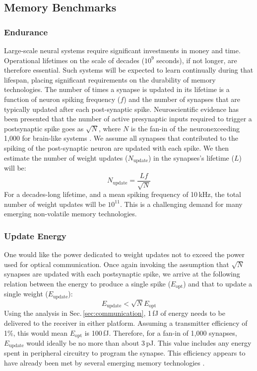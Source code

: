 \documentclass[twocolumn]{article}
\begin{document}
\subsection{Memory Benchmarks}

\subsubsection{Endurance}
Large-scale neural systems require significant investments in money and time. Operational lifetimes on the scale of decades ($10^9$ seconds), if not longer, are therefore essential. Such systems will be expected to learn continually during that lifespan, placing significant requirements on the durability of memory technologies. The number of times a synapse is updated in its lifetime is a function of neuron spiking frequency ($f$) and the number of synapses that are typically updated after each post-synaptic spike. Neuroscientific evidence has been presented that the number of active presynaptic inputs required to trigger a postsynaptic spike goes as $\sqrt{N}$, where $N$ is the fan-in of the neuron\textemdash exceeding 1,000 for brain-like systems \cite{vrso1996,vora2005}. We assume all synapses that contributed to the spiking of the post-synaptic neuron are updated with each spike. We then estimate the number of weight updates ($N_{\mathrm{update}}$) in the synapses's lifetime ($L$) will be:
\begin{equation}
    N_{\mathrm{update}} = \frac{Lf}{\sqrt{N}}
\end{equation}
For a decades-long lifetime, and a mean spiking frequency of 10\,kHz, the total number of weight updates will be $10^{11}$. This is a challenging demand for many emerging non-volatile memory technologies.

\subsubsection{Update Energy}
One would like the power dedicated to weight updates not to exceed the power used for optical communication. Once again invoking the assumption that $\sqrt{N}$ synapses are updated with each postsynaptic spike, we arrive at the following relation between the energy to produce a single spike ($E_{\mathrm{opt}}$) and that to update a single weight ($E_{\mathrm{update}}$):
\begin{equation}
    E_{\mathrm{update}} < \sqrt{N}E_{\mathrm{opt}}
\end{equation}
Using the analysis in Sec.\,\ref{sec:communication}, 1\,fJ of energy needs to be delivered to the receiver in either platform. Assuming a transmitter efficiency of 1\%, this would mean $E_{\mathrm{opt}}$ is 100\,fJ. Therefore, for a fan-in of 1,000 synapses, $E_{\mathrm{update}}$ would ideally be no more than about 3\,pJ. This value includes any energy spent in peripheral circuitry to program the synapse. This efficiency appears to have already been met by several emerging memory technologies \cite{zahoor2020resistive,schneider2018ultralow}.
\end{document}
